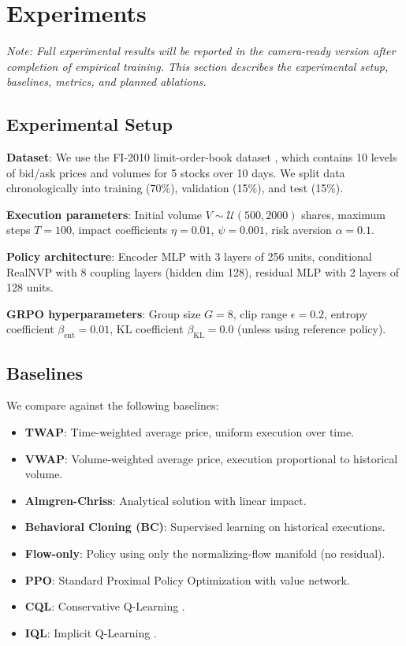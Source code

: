 \documentclass{article}
\begin{document}
\section{Experiments}
\label{sec:experiments}

\textit{Note: Full experimental results will be reported in the camera-ready version after completion of empirical training. This section describes the experimental setup, baselines, metrics, and planned ablations.}

\subsection{Experimental Setup}

\textbf{Dataset}: We use the FI-2010 limit-order-book dataset \citep{nystrom2014high}, which contains 10 levels of bid/ask prices and volumes for 5 stocks over 10 days. We split data chronologically into training (70\%), validation (15\%), and test (15\%).

\textbf{Execution parameters}: Initial volume $V \sim \mathcal{U}(500, 2000)$ shares, maximum steps $T=100$, impact coefficients $\eta=0.01$, $\psi=0.001$, risk aversion $\alpha=0.1$.

\textbf{Policy architecture}: Encoder MLP with 3 layers of 256 units, conditional RealNVP with 8 coupling layers (hidden dim 128), residual MLP with 2 layers of 128 units.

\textbf{GRPO hyperparameters}: Group size $G=8$, clip range $\epsilon=0.2$, entropy coefficient $\beta_{\text{ent}}=0.01$, KL coefficient $\beta_{\text{KL}}=0.0$ (unless using reference policy).

\subsection{Baselines}
We compare against the following baselines:

\begin{itemize}
    \item \textbf{TWAP}: Time-weighted average price, uniform execution over time.
    \item \textbf{VWAP}: Volume-weighted average price, execution proportional to historical volume.
    \item \textbf{Almgren-Chriss}: Analytical solution with linear impact.
    \item \textbf{Behavioral Cloning (BC)}: Supervised learning on historical executions.
    \item \textbf{Flow-only}: Policy using only the normalizing-flow manifold (no residual).
    \item \textbf{PPO}: Standard Proximal Policy Optimization with value network.
    \item \textbf{CQL}: Conservative Q-Learning \citep{kumar2020conservative}.
    \item \textbf{IQL}: Implicit Q-Learning \citep{kostrikov2022offline}.
\end{itemize}
\end{document}
